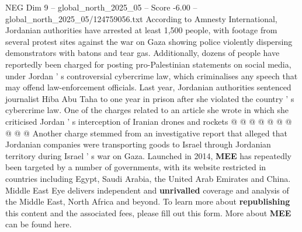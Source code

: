 \begin{textsample}{NEG Dim 9 – global\_north\_2025\_05 – Score -6.00 – global\_north\_2025\_05/124759056.txt}
According to Amnesty International, Jordanian authorities have arrested at least 1,500 people, with footage from several protest sites against the war on Gaza showing police violently dispersing demonstrators with batons and tear gas.
Additionally, dozens of people have reportedly been charged for posting pro-Palestinian statements on social media, under Jordan ' s controversial cybercrime law, which criminalises any speech that may offend law-enforcement officials.
Last year, Jordanian authorities sentenced journalist Hiba Abu Taha to one year in prison after she violated the country ' s cybercrime law.
One of the charges related to an article she wrote in which she criticised Jordan ' s interception of Iranian drones and rockets @ @ @ @ @ @ @ @ @ @ Another charge stemmed from an investigative report that alleged that Jordanian companies were transporting goods to Israel through Jordanian territory during Israel ' s war on Gaza.
Launched in 2014, \textbf{MEE} has repeatedly been targeted by a number of governments, with its website restricted in countries including Egypt, Saudi Arabia, the United Arab Emirates and China.
Middle East Eye delivers independent and \textbf{unrivalled} coverage and analysis of the Middle East, North Africa and beyond.
To learn more about \textbf{republishing} this content and the associated fees, please fill out this form.
More about \textbf{MEE} can be found here.

\end{textsample}
